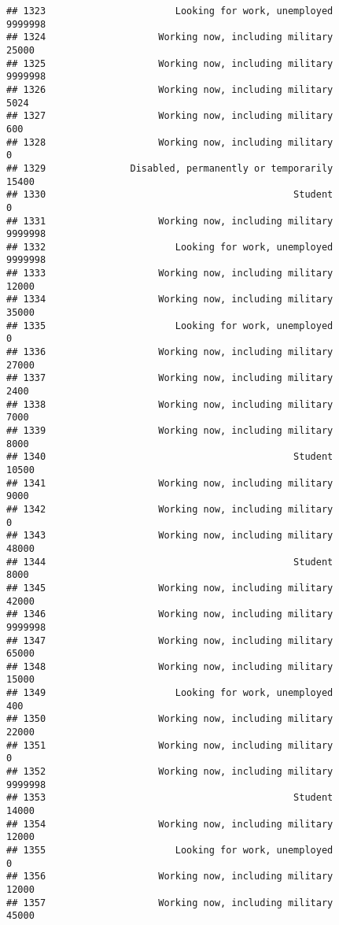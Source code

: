 \documentclass[]{book}
\theoremstyle{definition}
\theoremstyle{definition}
\theoremstyle{remark}
\begin{document}
\begin{verbatim}
## 1323                       Looking for work, unemployed         9999998
## 1324                    Working now, including military           25000
## 1325                    Working now, including military         9999998
## 1326                    Working now, including military            5024
## 1327                    Working now, including military             600
## 1328                    Working now, including military               0
## 1329               Disabled, permanently or temporarily           15400
## 1330                                            Student               0
## 1331                    Working now, including military         9999998
## 1332                       Looking for work, unemployed         9999998
## 1333                    Working now, including military           12000
## 1334                    Working now, including military           35000
## 1335                       Looking for work, unemployed               0
## 1336                    Working now, including military           27000
## 1337                    Working now, including military            2400
## 1338                    Working now, including military            7000
## 1339                    Working now, including military            8000
## 1340                                            Student           10500
## 1341                    Working now, including military            9000
## 1342                    Working now, including military               0
## 1343                    Working now, including military           48000
## 1344                                            Student            8000
## 1345                    Working now, including military           42000
## 1346                    Working now, including military         9999998
## 1347                    Working now, including military           65000
## 1348                    Working now, including military           15000
## 1349                       Looking for work, unemployed             400
## 1350                    Working now, including military           22000
## 1351                    Working now, including military               0
## 1352                    Working now, including military         9999998
## 1353                                            Student           14000
## 1354                    Working now, including military           12000
## 1355                       Looking for work, unemployed               0
## 1356                    Working now, including military           12000
## 1357                    Working now, including military           45000

\end{verbatim}
\end{document}
